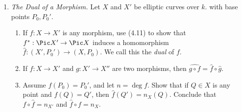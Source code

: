 \documentclass[12pt]{amsart}
\begin{document}
\begin{enumerate}
	\item[7.] {
      \textit{The Dual of a Morphism.}
      Let $X$ and $X'$ be elliptic curves over $k$. with base points $P_0,P_0'$.
      \begin{enumerate}
        \item If $f:X\to X'$ is any morphism, use (4.11) to show that $f^*:\Pic X'\to \Pic X$ induces a homomorphism $\widehat f:(X',P_0')\to (X,P_0)$.
          We call this the \emph{dual} of $f$.
        \item If $f:X\to X'$ and $g:X'\to X''$ are two morphisms, then $\widehat{g\circ f} = \hat f\circ \hat g$.
        \item Assume $f(P_0)=P_0'$, and let $n=\deg f$.
          Show that if $Q\in X$ is any point and $f(Q)=Q'$, then $\hat f(Q')=n_X(Q)$.
          Conclude that $f\circ \hat f = n_{X'}$ and $\hat f\circ f = n_X$.
      \end{enumerate}
    }
\end{enumerate}
\end{document}
